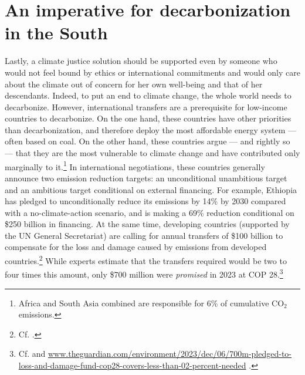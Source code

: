 \documentclass[a5paper,english,openany]{memoir}
\begin{document}
\section{An imperative for decarbonization in the South}

Lastly, a climate justice solution should be supported even by someone who would not feel bound by ethics or international commitments and would only care about the climate out of concern for her own well-being and that of her descendants. Indeed, to put an end to climate change, %
the whole world needs to decarbonize. 
However, international transfers are a prerequisite for low-income countries to decarbonize. On the one hand, these countries have other priorities than decarbonization, and therefore deploy the most affordable energy system --- often based on coal. On the other hand, these countries argue --- and rightly so --- that they are the most vulnerable to climate change and have contributed only marginally to it.\footnote{Africa and South Asia combined are responsible for 6\% of cumulative CO$_\text{2}$ emissions.} 
In international negotiations, these countries generally announce two emission reduction targets: an unconditional unambitious target and an ambitious target conditional on external financing. For example, Ethiopia has pledged to unconditionally reduce its emissions by 14\% by 2030 compared with a no-climate-action scenario, and is making a 69\% reduction conditional on \$250 billion in financing. %
At the same time, developing countries (supported by the UN General Secretariat) are calling for annual transfers of \$100 billion to compensate for the loss and damage caused by emissions from developed countries.\footnote{Cf. \cite{tc_proposal_2023,sgnu_bridgetown_2023}.} While experts estimate that the transfers required would be two to four times this amount, only \$700 million were \textit{promised} in 2023 at COP 28.\footnote{Cf. \cite{songwe_climate_2023,markandya_integrated_2019,robinson_valuing_2021} and \href{https://www.theguardian.com/environment/2023/dec/06/700m-pledged-to-loss-and-damage-fund-cop28-covers-less-than-02-percent-needed}{www.theguardian.com/environment/2023/dec/06/700m-pledged-to-loss-and-damage-fund-cop28-covers-less-than-02-percent-needed}%
.}
\end{document}
